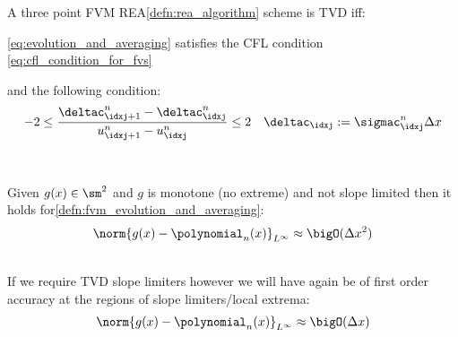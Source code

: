 \begin{lemmabox}\nospacing
    \begin{lemma}\label{lemma:tvd_fvm_rea_scheme}
        A three point FVM REA\cref{defn:rea_algorithm} scheme is TVD iff:
        \begin{circlelistnosep}
            \item \cref{eq:evolution_and_averaging} satisfies the CFL condition \cref{eq:cfl_condition_for_fvs}
            \item and the following condition:
            \begin{align}
              -2\leq\frac{\deltac_{\idxj+1}^{n}-\deltac_{\idxj}^{n}}{u_{\idxj+1}^{n}-u_{\idxj}^{n}}\leq2&&\deltac_{\idxj}:=\sigmac_{\idxj}^{n}\Delta x
            \end{align}
        \end{circlelistnosep}
    \end{lemma}
\end{lemmabox}
\begin{propositionbox}\nospacing
    \begin{proposition}\leavevmode\\
        \label{proposition:order_of_accuracy}
        \begin{minipage}{0.45\textwidth}
            Given $g(x)\in\sm^{2}$ and $g$ is monotone (no extreme) and not slope limited then it holds for\cref{defn:fvm_evolution_and_averaging}:
            \begin{align}
              \norm{g(x)-\polynomial_{n}(x)}_{L^{\infty}}\approx\bigO(\Delta x^{2})
            \end{align}
        \end{minipage}\hfill
        \begin{minipage}[c]{0.5\textwidth}
           \begin{figure}[H]
            \centering{
              \def\svgwidth{160pt}
              \resizebox{\linewidth}{!}{}
            }
        \end{figure}
        \end{minipage}\\
            If we require TVD slope limiters however we will have again be of first order accuracy
            at the regions of slope limiters/local extrema:
            \begin{align}
              \norm{g(x)-\polynomial_{n}(x)}_{L^{\infty}}\approx\bigO(\Delta x)
            \end{align}
    \end{proposition}
\end{propositionbox}
